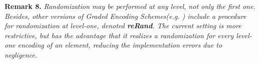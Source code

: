 \begin{enumerate}[label=(\alph*)]
\textbf{Remark 8.} \textit{Randomization may be performed at any level, not only the first one. Besides, other versions of Graded Encoding Schemes(e.g. \cite{CLT13}) include a procedure for randomization at level-one, denoted \textbf{reRand}. The current setting is more restrictive, but has the advantage that it realizes a randomization for every level-one encoding of an element, reducing the implementation errors due to negligence.}
\end{enumerate}